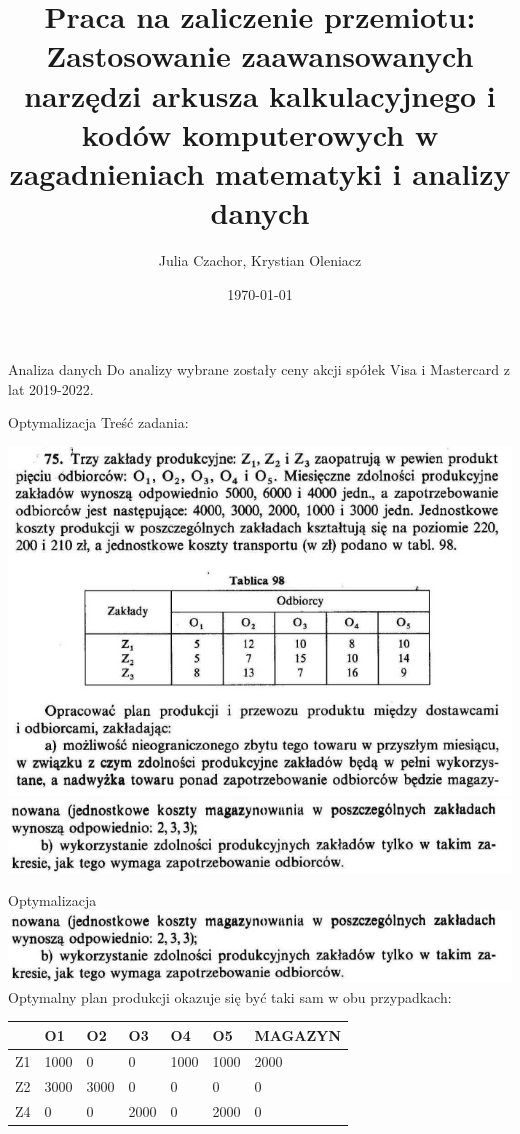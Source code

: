 \documentclass{beamer}
\title{Praca na zaliczenie przemiotu: Zastosowanie zaawansowanych narzędzi arkusza kalkulacyjnego i kodów komputerowych w zagadnieniach matematyki i analizy danych}
\date{\today}
\author{Julia Czachor, Krystian Oleniacz}
\begin{document}
  \maketitle
  \begin{frame}{Analiza danych}
    Do analizy wybrane zostały ceny akcji spółek Visa i Mastercard z lat 2019-2022. 


  \end{frame}
  \begin{frame}{Optymalizacja}
    Treść zadania:

    \includegraphics[scale=0.5]{images/obrazek1.png}
    \includegraphics[scale=0.5]{images/obrazek2.png}
  \end{frame}
  \begin{frame}{Optymalizacja}
    \includegraphics[scale=0.5]{images/obrazek2.png}
    Optymalny plan produkcji okazuje się być taki sam w obu przypadkach: 
    \begin{table}[]
      \begin{tabular}{|l|l|l|l|l|l|l|}
      \hline
         & O1   & O2   & O3   & O4   & O5   & MAGAZYN \\ \hline
      Z1 & 1000 & 0    & 0    & 1000 & 1000 & 2000    \\ \hline
      Z2 & 3000 & 3000 & 0    & 0    & 0    & 0       \\ \hline
      Z4 & 0    & 0    & 2000 & 0    & 2000 & 0       \\ \hline
      \end{tabular}
      \end{table}

  \end{frame}
 
\end{document}
